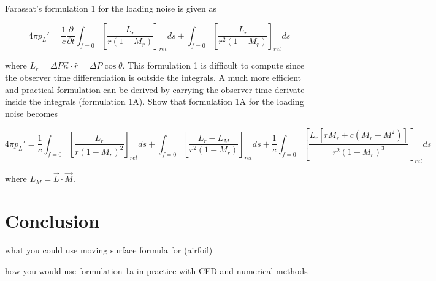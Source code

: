 \documentclass[]{aiaa-tc}%
\begin{document}
Farassat’s formulation 1 for the loading noise is given as

\begin{equation} \label{FarassatForm1Loading}
4\pi p_{L}' = \dfrac{1}{c} \dfrac{\partial}{\partial t}
      \int_{f=0} \left[ \dfrac{L_r}{r   (1 - M_r)} \right]_{ret} ds
    + \int_{f=0} \left[ \dfrac{L_r}{r^2 (1 - M_r)} \right]_{ret} ds
\end{equation}


\noindent where $L_r = \Delta P \vec{n} \cdot \hat{r} = \Delta P \cos\theta$. This formulation 1 is difficult to compute since the observer time differentiation is outside the integrals. A much more efficient and practical formulation can be derived by carrying the observer time derivate inside the integrals (formulation 1A). Show that formulation 1A for the loading noise becomes

\begin{equation} \label{FarassatForm1ALoadingEx}
4\pi p_{L}' = \dfrac{1}{c}
      \int_{f=0} \left[ \dfrac{\dot{L}_r}{r (1 - M_r)^2} \right]_{ret} ds
    + \int_{f=0} \left[ \dfrac{L_r - L_M}{r^2 (1 - M_r)} \right]_{ret} ds
+ \dfrac{1}{c} \int_{f=0} \left[
    \dfrac{ L_r[r \dot{M}_r + c(M_r - M^2)] }{r^2 (1 - M_r)^3} \right]_{ret} ds
\end{equation}

\noindent where $L_M = \vec{L} \cdot \vec{M} $.




\section*{Conclusion}

what you could use moving surface formula for (airfoil)

how you would use formulation 1a in practice with CFD and numerical methods
\end{document}
